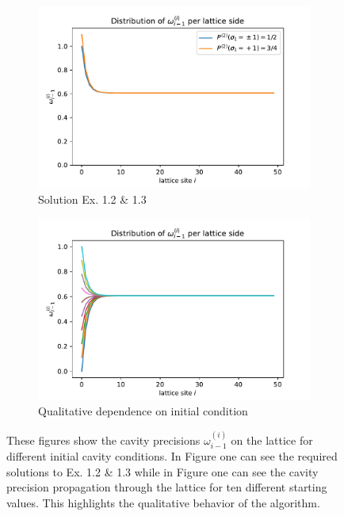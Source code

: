 \documentclass[main.tex]{subfiles}
\begin{document}
\begin{figure}[htpb]
    \centering

    \begin{subfigure}{\textwidth}
        \centering
        \includegraphics[width=.9\linewidth]{../figures/1_2_precisions.pdf}
        \caption{Solution Ex. 1.2 \& 1.3}
        \label{fig:lattice_precisions_ex}
    \end{subfigure}

    \begin{subfigure}{\textwidth}
        \centering
        \includegraphics[width=.9\linewidth]{../figures/1_3_precisions.pdf}
        \caption{Qualitative dependence on initial condition}
        \label{fig:lattice_precisions_behavior}
    \end{subfigure} 
    \caption{
        These figures show the cavity precisions $\omega_{ i-1 } ^{(i)}$ on the lattice for different initial cavity conditions.
        In Figure  one can see the required solutions to Ex. 1.2 \& 1.3 while in Figure  one can see the cavity precision propagation through the lattice for ten different starting values. 
        This highlights the qualitative behavior of the algorithm.
    }
    \label{fig:lattice_precisions}
\end{figure}
\end{document}
